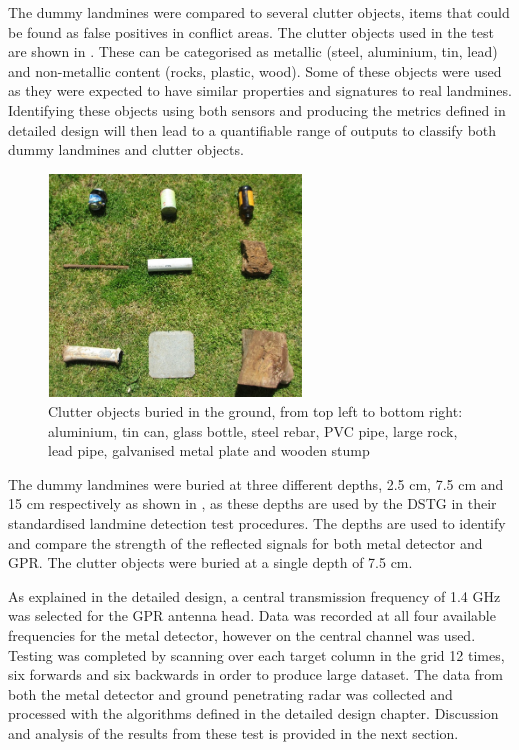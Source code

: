 \documentclass[main.tex]{subfiles}
\begin{document}
The dummy landmines were compared to several clutter objects, items that could be found as false positives in conflict areas. The clutter objects used in the test are shown in . These can be categorised as metallic (steel, aluminium, tin, lead) and non-metallic content (rocks, plastic, wood). Some of these objects were used as they were expected to have similar properties and signatures to real landmines. Identifying these objects using both sensors and producing the metrics defined in detailed design will then lead to a quantifiable range of outputs to classify both dummy landmines and clutter objects.

\begin{figure}[ht]
\includegraphics[width=0.6\textwidth]{5-Testing/clutter.PNG}
\centering
\caption[Clutter objects buried in the ground]{Clutter objects buried in the ground, from top left to bottom right: aluminium, tin can, glass bottle, steel rebar, PVC pipe, large rock, lead pipe, galvanised metal plate and wooden stump}
\end{figure}

The dummy landmines were buried at three different depths, 2.5 cm, 7.5 cm and 15 cm respectively as shown in , as these depths are used by the DSTG in their standardised landmine detection test procedures. The depths are used to identify and compare the strength of the reflected signals for both metal detector and GPR. The clutter objects were buried at a single depth of 7.5 cm.

As explained in the detailed design, a central transmission frequency of 1.4 GHz was selected for the GPR antenna head. Data was recorded at all four available frequencies for the metal detector, however on the central channel was used. Testing was completed by scanning over each target column in the grid 12 times, six forwards and six backwards in order to produce large dataset. The data from both the metal detector and ground penetrating radar was collected and processed with the algorithms defined in the detailed design chapter. Discussion and analysis of the results from these test is provided in the next section. 
\end{document}
